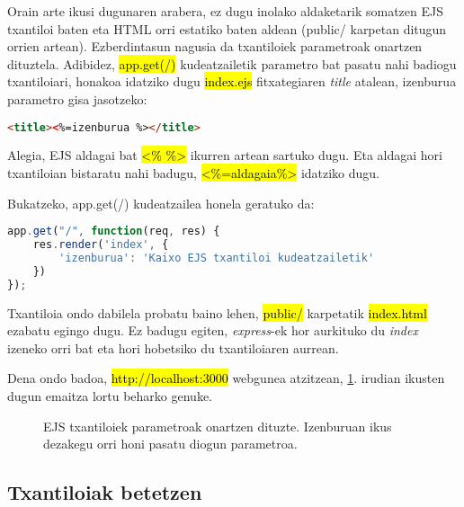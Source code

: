 Orain arte ikusi dugunaren arabera, ez dugu inolako aldaketarik somatzen EJS txantiloi baten eta HTML orri estatiko baten aldean (public/ karpetan ditugun orrien artean). Ezberdintasun nagusia da txantiloiek parametroak onartzen dituztela. Adibidez, \hl{app.get(\textquotesingle{}/\textquotesingle{})} kudeatzailetik parametro bat pasatu nahi badiogu txantiloiari, honakoa idatziko dugu \hl{index.ejs} fitxategiaren \textit{title} atalean, izenburua parametro gisa jasotzeko:

\begin{lstlisting}[language=HTML]
<title><%=izenburua %></title>    
\end{lstlisting}

Alegia, EJS aldagai bat \hl{<\% \%>} ikurren artean sartuko dugu. Eta aldagai hori txantiloian bistaratu nahi badugu, \hl{<\%=aldagaia\%> } idatziko dugu.

Bukatzeko, app.get(\textquotesingle{}/\textquotesingle{}) kudeatzailea honela geratuko da:

\begin{lstlisting}[language=JavaScript]
app.get("/", function(req, res) {
    res.render('index', {
        'izenburua': 'Kaixo EJS txantiloi kudeatzailetik'    
    }) 
});
\end{lstlisting}

Txantiloia ondo dabilela probatu baino lehen, \hl{public/} karpetatik \hl{index.html} ezabatu egingo dugu. Ez badugu egiten, \textit{express}-ek hor aurkituko du \textit{index} izeneko orri bat eta hori hobetsiko du txantiloiaren aurrean. 

Dena ondo badoa, \hl{http://localhost:3000} webgunea atzitzean, \ref{fig:txantiloia1-ejs}. irudian ikusten dugun emaitza lortu beharko genuke.

\begin{figure}[ht]
	\centering
{}
\caption{EJS txantiloiek parametroak onartzen dituzte. Izenburuan ikus dezakegu orri honi pasatu diogun parametroa.}
\label{fig:txantiloia1-ejs}
\end{figure}

\subsection{Txantiloiak betetzen}

